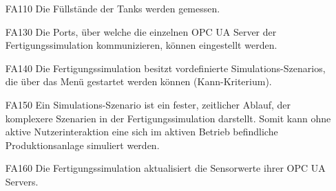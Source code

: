 \documentclass[parskip=full]{scrartcl}
\begin{document}
\begin{enumerate}
    diesen \glspl{Sensordatum} abfragen.
  \item[FA110] Die Füllstände der Tanks werden gemessen.
  \item[FA130] Die Ports, über welche die einzelnen \gls{OPC UA Server} der \gls{Fertigungssimulation} kommunizieren, können eingestellt werden.
  \item[FA140] Die \gls{Fertigungssimulation} besitzt vordefinierte \glspl{Simulations-Szenario}, die über das Menü gestartet werden können (Kann-Kriterium).
  \item[FA150] Ein \gls{Simulations-Szenario} ist ein fester, zeitlicher Ablauf, der komplexere Szenarien in der \gls{Fertigungssimulation} darstellt. Somit kann ohne aktive Nutzerinteraktion eine sich
    im aktiven Betrieb befindliche \gls{Produktionsanlage} simuliert werden.
  \item[FA160] Die \gls{Fertigungssimulation} aktualisiert die Sensorwerte ihrer \glspl{OPC UA Server}.
\end{enumerate}
\end{document}
